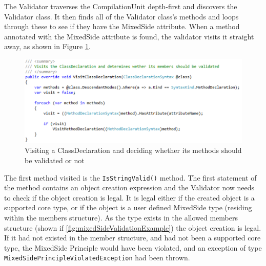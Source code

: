 		The Validator traverses the CompilationUnit depth-first and discovers the Validator class. It then finds all of the Validator class's methods and loops through these to see if they have the MixedSide attribute. When a method annotated with the MixedSide attribute is found, the validator visits it straight away, as shown in Figure \ref{fig:ValidatorVisitClassDeclaration}. 

		\begin{figure}[H]
			\begin{center}
				\centerline{\includegraphics[width=14cm]{resources/images/ValidatorVisitClassDeclaration.png}}
			\end{center}
			\caption{Visiting a ClassDeclaration and deciding whether its methods should be validated or not}
			\label{fig:ValidatorVisitClassDeclaration}
		\end{figure}

		The first method visited is the \texttt{IsStringValid()} method. The first statement of the method contains an object creation expression and the Validator now needs to check if the object creation is legal. It is legal either if the created object is a supported core type, or if the object is a user defined MixedSide type (residing within the members structure). As the type exists in the allowed members structure (shown if \ref{fig:mixedSideValidationExample}) the object creation is legal. If it had not existed in the member structure, and had not been a supported core type, the MixedSide Principle would have been violated, and an exception of type \texttt{MixedSidePrincipleViolatedException} had been thrown.








	
